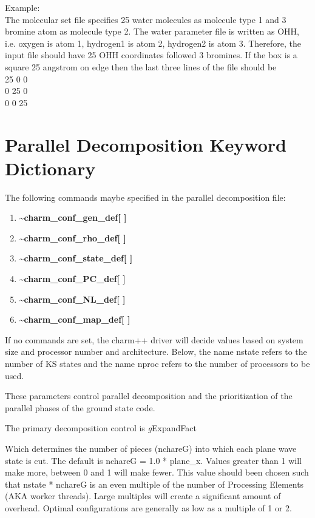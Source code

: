 \documentclass[12pt,titlepage]{article}
\begin{document}
Example: \\ 
The molecular set file specifies 25 water molecules as molecule
type 1 and 3 bromine atom as molecule type 2. The water parameter file is 
written as OHH, i.e. oxygen is atom 1, hydrogen1 is atom 2, hydrogen2 is 
atom 3. Therefore, the input file should have 25 OHH coordinates followed
3 bromines. If the box is a square 25 angstrom on edge 
then the last three lines of the file should be \\
\hspace*{1.5in}  25  0  0  \\
\hspace*{1.5in}  0  25  0  \\
\hspace*{1.5in}  0  0   25 \\

\newpage
\section{\bf Parallel Decomposition Keyword Dictionary} 

The following commands maybe specified in the parallel decomposition file:
\begin{enumerate}
\item {\bf \~{ }charm\_conf\_gen\_def[ ]}
\item {\bf \~{ }charm\_conf\_rho\_def[ ]}
\item {\bf \~{ }charm\_conf\_state\_def[ ]}
\item {\bf \~{ }charm\_conf\_PC\_def[ ]}
\item {\bf \~{ }charm\_conf\_NL\_def[ ]}
\item {\bf \~{ }charm\_conf\_map\_def[ ]}
\end{enumerate}
If no commands are set, the charm++ driver will decide values based
on system size and processor number and architecture. Below, the 
name nstate refers to the number of KS states and the name nproc
refers to the number of processors to be used.

These parameters control parallel decomposition and the prioritization
of the parallel phases of the ground state code.

The primary decomposition control is  {\emph gExpandFact}    

Which determines the number of pieces (nchareG) into which each plane
wave state is cut.  The default is nchareG = 1.0 * plane\_x.  Values greater
than 1 will make more, between 0 and 1 will make fewer.  This value
should been chosen such that nstate * nchareG is an even
multiple of the number of Processing Elements (AKA worker
threads). Large multiples will create a significant amount of
overhead.  Optimal configurations are generally as low as a multiple
of 1 or 2.
\end{document}
